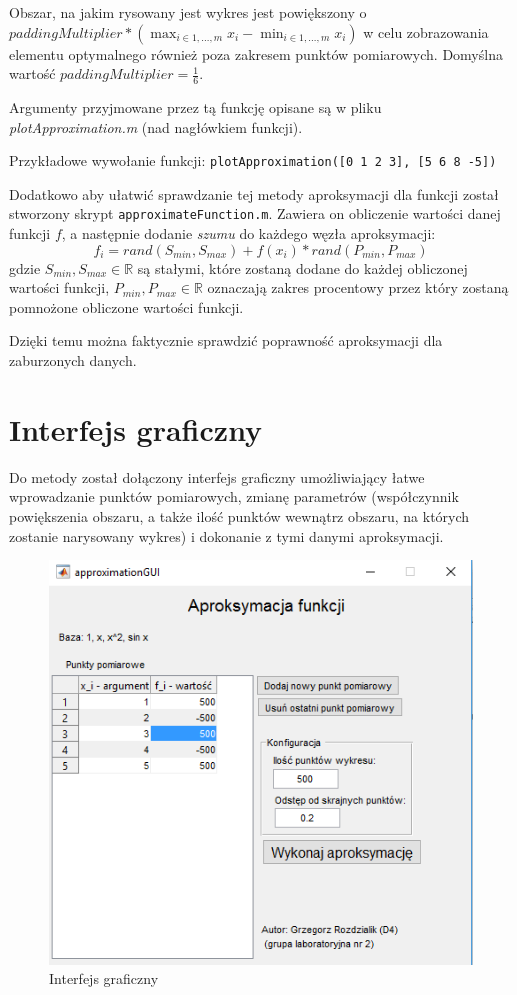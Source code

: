 \documentclass[12pt]{article}
\begin{document}
	Obszar, na jakim rysowany jest wykres jest powiększony o $paddingMultiplier * (\max_{i \in {1, \dots, m}} x_i - \min_{i \in {1, \dots, m}} x_i)$ w celu zobrazowania elementu optymalnego również poza zakresem punktów pomiarowych. Domyślna wartość $paddingMultiplier = \frac{1}{6}$.
	
	Argumenty przyjmowane przez tą funkcję opisane są w pliku \textit{plotApproximation.m} (nad nagłówkiem funkcji).
	
	Przykładowe wywołanie funkcji:
	\texttt{plotApproximation([0 1 2 3], [5 6 8 -5])}
	
	Dodatkowo aby ułatwić sprawdzanie tej metody aproksymacji dla funkcji został stworzony skrypt \texttt{approximateFunction.m}. Zawiera on obliczenie wartości danej funkcji $f$, a następnie dodanie \textit{szumu} do każdego węzła aproksymacji:
	$$
	f_i = rand(S_{min}, S_{max}) +  f(x_i) * rand(P_{min}, P_{max})
	$$
	gdzie $S_{min}, S_{max} \in \mathbb{R}$ są stałymi, które zostaną dodane do każdej obliczonej wartości funkcji, $P_{min}, P_{max} \in \mathbb{R}$ oznaczają zakres procentowy przez który zostaną pomnożone obliczone wartości funkcji.
	
	Dzięki temu można faktycznie sprawdzić poprawność aproksymacji dla zaburzonych danych.
	
	
	\section{Interfejs graficzny}
	Do metody został dołączony interfejs graficzny umożliwiający łatwe wprowadzanie punktów pomiarowych, zmianę parametrów (współczynnik powiększenia obszaru, a także ilość punktów wewnątrz obszaru, na których zostanie narysowany wykres) i dokonanie z tymi danymi aproksymacji.
	
	\begin{figure}[H]
		\centering
		\includegraphics[scale=1]{images/gui.png}
		\caption{Interfejs graficzny}
		\label{GUI}
	\end{figure}
	
\end{document}
